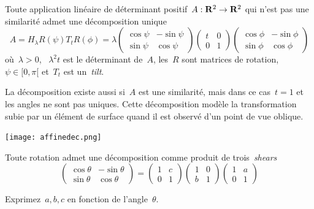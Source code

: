 \begin{proposition}
	Toute application linéaire de déterminant positif~$A:\mathbf{R}^2\to\mathbf{R}^2$ qui n'est
	pas une similarité admet une décomposition unique
	\[
		A = H_\lambda R(\psi)T_tR(\phi)
		= \lambda
		\begin{pmatrix}\cos\psi & -\sin\psi\\\sin\psi & \cos\psi\end{pmatrix}
		\begin{pmatrix}t & 0 \\0 & 1\end{pmatrix}
		\begin{pmatrix}\cos\phi & -\sin\phi\\\sin\phi & \cos\phi\end{pmatrix}
	\]
	où~$\lambda>0$, ~$\lambda^2t$ est le déterminant de~$A$, les~$R$ sont
	matrices de rotation,~$\psi\in[0,\pi[$ et~$T_t$ est un~\emph{tilt}.
\end{proposition}

La décomposition existe aussi si~$A$ est une similarité, mais dans ce
cas~$t=1$ et les angles ne sont pas uniques.
Cette décomposition modèle la transformation subie par un élément de surface
quand il est observé d'un point de vue oblique.

\begin{center}
	\texttt{[image: affinedec.png]}
\end{center}


\bigskip

\begin{proposition}
	Toute rotation admet une décomposition comme produit de trois~\emph{shears}
	\[
		\begin{pmatrix}\cos\theta & -\sin\theta\\\sin\theta & \cos\theta\end{pmatrix}
		=
		\begin{pmatrix}1&c\\0&1\end{pmatrix}
		\begin{pmatrix}1&0\\b&1\end{pmatrix}
		\begin{pmatrix}1&a\\0&1\end{pmatrix}
	\]
\end{proposition}

\begin{exercice}
	Exprimez~$a,b,c$ en fonction de l'angle~$\theta$.
\end{exercice}

